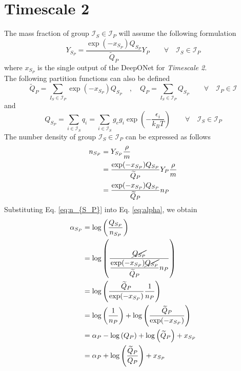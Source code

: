 \documentclass{article}
\begin{document}
	\section{Timescale 2}
	The mass fraction of group $\mathcal{I}_S\in\mathcal{I}_P$ will assume the following formulation
	\begin{equation*}
		Y_{S_P}=\frac{\exp(-x_{S_P})Q_{S_P}}{\widetilde{Q}_P}Y_P\qquad\forall\quad\mathcal{I}_S\in \mathcal{I}_P
	\end{equation*}
	where $x_{S_P}$ is the single output of the DeepONet for \textit{Timescale 2}.\\
	The following partition functions can also be defined
	\begin{equation*}
		\widetilde{Q}_P=\sum_{{I}_S\in\mathcal{I}_P} \exp(-x_{S_P})Q_{S_P}
		\quad,\quad
		Q_P=\sum_{{I}_S\in\mathcal{I}_P}Q_{S_P}
		\qquad
		\forall\quad\mathcal{I}_P\in \mathcal{I}
	\end{equation*}
	and
	\begin{equation*}
		Q_{S_P}=\sum_{i\in\mathcal{I}_S}q_i=\sum_{i\in\mathcal{I}_S}g_eg_i\exp\left(-\frac{\epsilon_i}{k_BT}\right)
		\qquad\forall\quad\mathcal{I}_S\in\mathcal{I}_P
	\end{equation*}
	The number density of group $\mathcal{I}_S\in\mathcal{I}_P$ can be expressed as follows
	\begin{align}\label{eq:n_{S_P}}
		n_{S_P}&=Y_{S_P}\frac{\rho}{m}\nonumber\\
		&=\frac{\exp(-x_{S_P})Q_{S_P}}{\widetilde{Q}_P}Y_P\frac{\rho}{m}\nonumber\\
		&=\frac{\exp(-x_{S_P})Q_{S_P}}{\widetilde{Q}_P}n_P
	\end{align}
	Substituting Eq. \eqref{eq:n_{S_P}} into Eq. \eqref{eq:alpha}, we obtain
	\begin{align*}
		\alpha_{S_P}&=\log\left(\frac{Q_{S_P}}{n_{S_P}}\right)\\
		&=\log\left(\frac{\cancel{Q_{S_P}}}{\dfrac{\exp(-x_{S_P})\cancel{Q_{S_P}}}{\widetilde{Q}_P}n_P}\right)\\
		&=\log\left(\frac{\widetilde{Q}_P}{\exp(-x_{S_P})}\frac{1}{n_P}\right)\\
		&=\log\left(\frac{1}{n_P}\right)+\log\left(\frac{\widetilde{Q}_P}{\exp(-x_{S_P})}\right)\\
		&=\alpha_P-\log\left(Q_P\right)+\log\left(\widetilde{Q}_P\right)+x_{S_P}\\
		&=\alpha_P+\log\left(\frac{\widetilde{Q}_P}{Q_P}\right)+x_{S_P}
	\end{align*}
\end{document}
